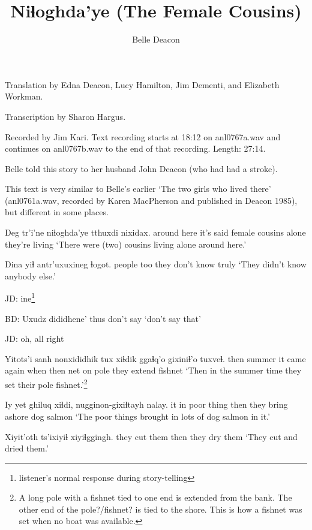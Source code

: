 \documentclass[12pt]{article}
\begin{document}
\title{Niɬoghda'ye (The Female Cousins)}
\author{Belle Deacon}
\date{}
\maketitle


Translation by Edna Deacon, Lucy Hamilton, Jim Dementi, and Elizabeth Workman.  

Transcription by Sharon Hargus.  

Recorded by Jim Kari. Text recording starts at 18:12 on anl0767a.wav and continues on anl0767b.wav to the end of that recording. 
Length:  27:14.

Belle told this story to her husband John Deacon (who had had a stroke). 

This text is very similar to Belle's earlier `The two girls who lived there' (anl0761a.wav, recorded by Karen MacPherson and published in Deacon 1985), but different in some places.


\gll Deg         tr'i'ne   niɬoghda'ye tthuxdi nixidax.
{around here} {it's said} {female cousins} alone    {they're living}
\glt `There were (two) cousins living alone around here.'
\glend 

\gll Dina   yiɬ antr'uxuxineg   ɬogot.
people too {they don't know} truly
\glt `They didn't know anybody else.'
\glend 

JD:  ine\footnote{listener's normal response during story-telling}

BD:  
\gll Uxudz dididhene'
thus  {don't say}    
\glt `don't say that'
\glend

JD:  oh, all right

\gll Yitots'i sanh   nonxididhik   tux  xiɬdik ggaɬq'o gixiniɬ'o         tuxveɬ.
then     summer {it came again} when then   {net on pole} {they extend} fishnet
\glt `Then in the summer time they set their pole
fishnet.'\footnote{A long pole with a fishnet tied to one end is extended from the bank. The other end of the pole?/fishnet? is tied to the shore. This is how a fishnet was set when no boat was available.}
\glend

\gll Iy yet ghiluq     xiɬdi, nugginon-gixiɬtayh nalay.
it in  {poor thing} then  {they bring ashore}    {dog salmon}
\glt `The poor things brought in lots of dog salmon in it.'
\glend

\gll Xiyit'oth ts'ixiyiɬ xiyiɬggingh.
{they cut them} then {they dry them}
\glt `They cut and dried them.'
\glend
\end{document}
